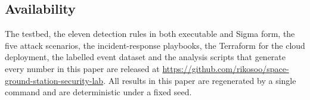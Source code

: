 \subsection*{Availability}

The testbed, the eleven detection rules in both executable and Sigma form, the
five attack scenarios, the incident-response playbooks, the Terraform for the
cloud deployment, the labelled event dataset and the analysis scripts that
generate every number in this paper are released at
\url{https://github.com/rikosoo/space-ground-station-security-lab}. All results
in this paper are regenerated by a single command and are deterministic under a
fixed seed.
